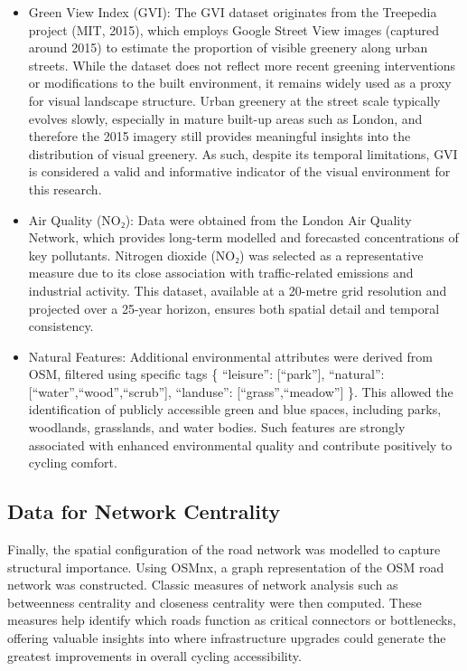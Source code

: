 \documentclass[
  12pt,
  oneside]{book}
\begin{document}
\begin{itemize}
\item
  Green View Index (GVI): The GVI dataset originates from the Treepedia project (MIT, 2015), which employs Google Street View images (captured around 2015) to estimate the proportion of visible greenery along urban streets. While the dataset does not reflect more recent greening interventions or modifications to the built environment, it remains widely used as a proxy for visual landscape structure. Urban greenery at the street scale typically evolves slowly, especially in mature built-up areas such as London, and therefore the 2015 imagery still provides meaningful insights into the distribution of visual greenery. As such, despite its temporal limitations, GVI is considered a valid and informative indicator of the visual environment for this research.
\item
  Air Quality (NO₂): Data were obtained from the London Air Quality Network, which provides long-term modelled and forecasted concentrations of key pollutants. Nitrogen dioxide (NO₂) was selected as a representative measure due to its close association with traffic-related emissions and industrial activity. This dataset, available at a 20-metre grid resolution and projected over a 25-year horizon, ensures both spatial detail and temporal consistency.
\item
  Natural Features: Additional environmental attributes were derived from OSM, filtered using specific tags \{ ``leisure'': {[}``park''{]}, ``natural'': {[}``water'',``wood'',``scrub''{]}, ``landuse'': {[}``grass'',``meadow''{]} \}. This allowed the identification of publicly accessible green and blue spaces, including parks, woodlands, grasslands, and water bodies. Such features are strongly associated with enhanced environmental quality and contribute positively to cycling comfort.
\end{itemize}

\subsection{Data for Network Centrality}\label{data-for-network-centrality}

Finally, the spatial configuration of the road network was modelled to capture structural importance. Using OSMnx, a graph representation of the OSM road network was constructed. Classic measures of network analysis such as betweenness centrality and closeness centrality were then computed. These measures help identify which roads function as critical connectors or bottlenecks, offering valuable insights into where infrastructure upgrades could generate the greatest improvements in overall cycling accessibility.
\end{document}
